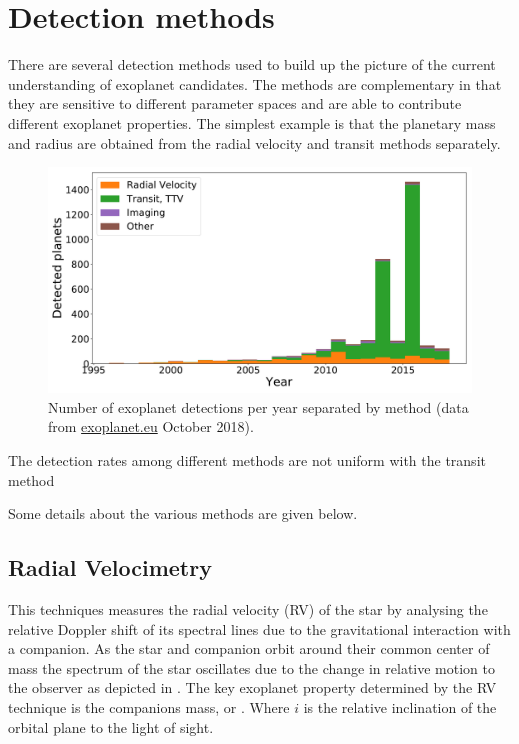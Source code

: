\section{Detection methods}
There are several detection methods used to build up the picture of the current understanding of exoplanet candidates. The methods are complementary in that they are sensitive to different parameter spaces and are able to contribute different exoplanet properties. The simplest example is that the planetary mass and radius are obtained from the radial velocity and transit methods separately.


\begin{figure}
    \centering
    \includegraphics[width=0.7\linewidth]{./figures/introduction/exoplanetEU_year_method.pdf}
    \caption{Number of exoplanet detections per year separated by method (data from \href{http://ww.exoplanet.eu}{exoplanet.eu} October 2018).}
    \label{fig:detection_year_method}
\end{figure}



The detection rates among different methods are not uniform with the transit method

Some details about the various methods are given below.

\subsection{Radial Velocimetry}
This techniques measures the radial velocity (RV) of the star by analysing the relative Doppler shift of its spectral lines due to the gravitational interaction with a companion. As the star and companion orbit around their common center of mass the spectrum of the star oscillates due to the change in relative motion to the observer as depicted in . The key exoplanet property determined by the RV technique is the companions mass, or \mtwosini. Where $i$ is the relative inclination of the orbital plane to the light of sight.

